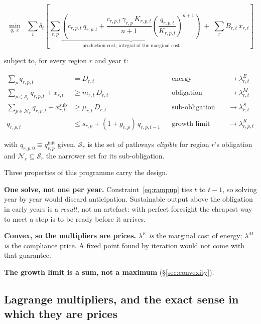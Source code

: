 \documentclass[11pt,a4paper]{article}
\begin{document}
\begin{equation}
\min_{q,\;x}\;\; \sum_{t} \delta_t \left[
  \sum_{r,p} \underbrace{\left( c_{r,p,t}\, q_{r,p,t}
    + \frac{c_{r,p,t}\,\gamma_{r,p}\,K_{r,p,t}}{n+1}
      \left(\frac{q_{r,p,t}}{K_{r,p,t}}\right)^{n+1} \right)}_{\text{production cost, integral of the marginal cost}}
  \;+\; \sum_{r} B_{r,t}\, x_{r,t}
\right]
\label{eq:objective}
\end{equation}

subject to, for every region $r$ and year $t$:

\begin{align}
\sum_{p} q_{r,p,t} &= D_{r,t}
  && \text{energy balance} && \to \lambda^{E}_{r,t} \label{eq:balance}\\[1mm]
\sum_{p \in \mathcal{S}_r} q_{r,p,t} + x_{r,t} &\ge m_{r,t}\, D_{r,t}
  && \text{obligation} && \to \lambda^{M}_{r,t} \label{eq:mandate}\\[1mm]
\sum_{p \in \mathcal{N}_r} q_{r,p,t} + x^{\mathrm{sub}}_{r,t} &\ge \mu_{r,t}\, D_{r,t}
  && \text{sub-obligation} && \to \lambda^{S}_{r,t} \label{eq:submandate}\\[1mm]
q_{r,p,t} &\le s_{r,p} + (1+g_{r,p})\, q_{r,p,t-1}
  && \text{growth limit} && \to \lambda^{R}_{r,p,t} \label{eq:rampup}
\end{align}

with $q_{r,p,0} \equiv q^{\mathrm{init}}_{r,p}$ given. $\mathcal{S}_r$ is the set of
pathways \emph{eligible} for region $r$'s obligation and $\mathcal{N}_r \subseteq
\mathcal{S}_r$ the narrower set for its sub-obligation.

Three properties of this programme carry the design.

\begin{keybox}
\textbf{One solve, not one per year.} Constraint~\eqref{eq:rampup} ties $t$ to $t-1$, so
solving year by year would discard anticipation. Sustainable output above the obligation
in early years is a \emph{result}, not an artefact: with perfect foresight the cheapest
way to meet a step is to be ready before it arrives.

\textbf{Convex, so the multipliers are prices.} $\lambda^{E}$ \emph{is} the marginal cost
of energy; $\lambda^{M}$ \emph{is} the compliance price. A fixed point found by
iteration would not come with that guarantee.

\textbf{The growth limit is a sum, not a maximum} (\S\ref{sec:convexity}).
\end{keybox}

\subsection{Lagrange multipliers, and the exact sense in which they are prices}
\label{sec:duality}
\end{document}
